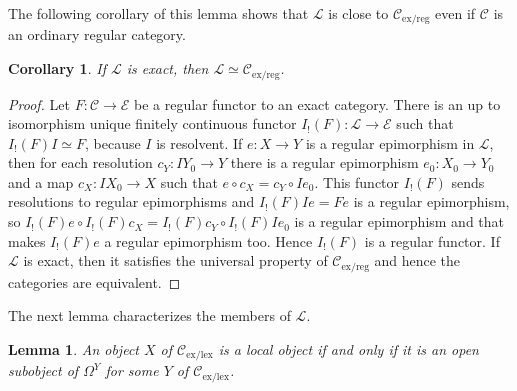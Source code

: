 \documentclass[sort&compress]{elsarticle}
\theoremstyle{plain}
\newtheorem{lemma}[theorem]{Lemma}
\newtheorem{corol}[theorem]{Corollary}
\theoremstyle{definition}
\theoremstyle{remark}
\newcommand\cat\mathcal
\newcommand\exlex{_\mathrm{ex/lex}}\newcommand\exreg{_\mathrm{ex/reg}}
\begin{document}
The following corollary of this lemma shows that $\cat L$ is close to $\cat C\exreg$ even if $\cat C$ is an ordinary regular category.

\begin{corol} If $\cat L$ is exact, then $\cat L\simeq \cat C\exreg$. \label{LisCer}\end{corol}

\begin{proof} Let $F:\cat C\to\cat E$ be a regular functor to an exact category. There is an up to isomorphism unique finitely continuous functor $I_!(F):\cat L \to \cat E$ such that $I_!(F)I\simeq F$, because $I$ is resolvent. If $e:X\to Y$ is a regular epimorphism in $\cat L$, then for each resolution $c_Y:IY_0 \to Y$ there is a regular epimorphism $e_0:X_0 \to Y_0$ and a map $c_X: IX_0 \to X$ such that $e\circ c_X = c_Y \circ Ie_0$. This functor $I_!(F)$ sends resolutions to regular epimorphisms and $I_!(F)Ie = Fe$ is a regular epimorphism, so $I_!(F)e\circ I_!(F)c_X = I_!(F)c_Y \circ I_!(F)Ie_0$ is a regular epimorphism and that makes $I_!(F)e$ a regular epimorphism too. Hence $I_!(F)$ is a regular functor. If $\cat L$ is exact, then it satisfies the universal property of $\cat C\exreg$ and hence the categories are equivalent.
\end{proof}


The next lemma characterizes the members of $\cat L$.

\begin{lemma} An object $X$ of $\cat C\exlex$ is a local object if and only if it is an open subobject of $\Omega^Y$ for some $Y$ of $\cat C\exlex$. \label{localequiv}\end{lemma}
\end{document}
